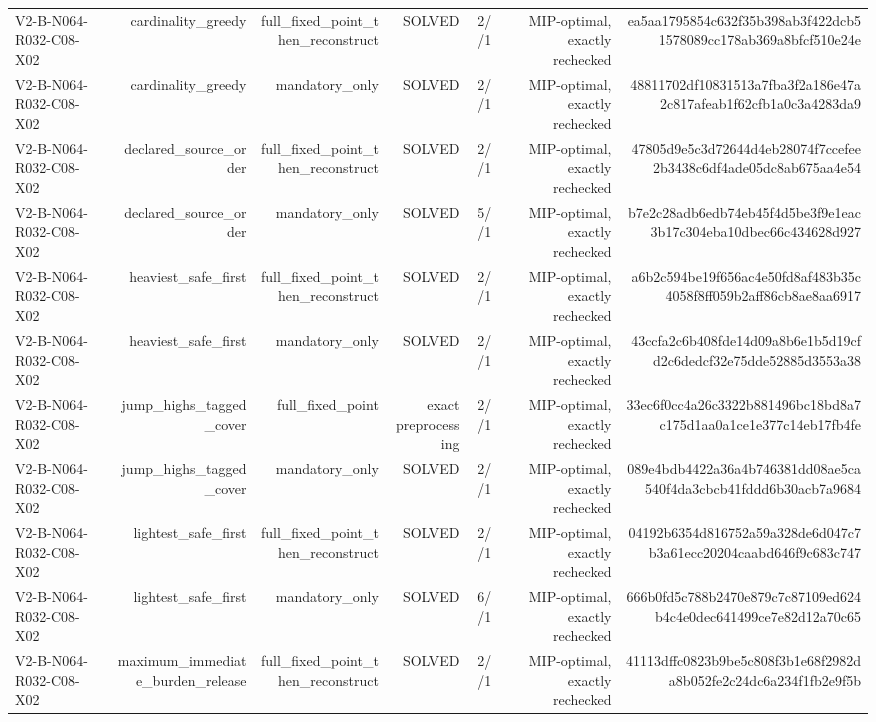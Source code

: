 {\begin{longtable}{lrrrrrr}
V2-B-N064-R032-C08-X02 & cardinality\_greedy & full\_fixed\_point\_then\_reconstruct & SOLVED & 2//1 & MIP-optimal, exactly rechecked & ea5aa1795854c632f35b398ab3f422dcb51578089cc178ab369a8bfcf510e24e \\
V2-B-N064-R032-C08-X02 & cardinality\_greedy & mandatory\_only & SOLVED & 2//1 & MIP-optimal, exactly rechecked & 48811702df10831513a7fba3f2a186e47a2c817afeab1f62cfb1a0c3a4283da9 \\
V2-B-N064-R032-C08-X02 & declared\_source\_order & full\_fixed\_point\_then\_reconstruct & SOLVED & 2//1 & MIP-optimal, exactly rechecked & 47805d9e5c3d72644d4eb28074f7ccefee2b3438c6df4ade05dc8ab675aa4e54 \\
V2-B-N064-R032-C08-X02 & declared\_source\_order & mandatory\_only & SOLVED & 5//1 & MIP-optimal, exactly rechecked & b7e2c28adb6edb74eb45f4d5be3f9e1eac3b17c304eba10dbec66c434628d927 \\
V2-B-N064-R032-C08-X02 & heaviest\_safe\_first & full\_fixed\_point\_then\_reconstruct & SOLVED & 2//1 & MIP-optimal, exactly rechecked & a6b2c594be19f656ac4e50fd8af483b35c4058f8ff059b2aff86cb8ae8aa6917 \\
V2-B-N064-R032-C08-X02 & heaviest\_safe\_first & mandatory\_only & SOLVED & 2//1 & MIP-optimal, exactly rechecked & 43ccfa2c6b408fde14d09a8b6e1b5d19cfd2c6dedcf32e75dde52885d3553a38 \\
V2-B-N064-R032-C08-X02 & jump\_highs\_tagged\_cover & full\_fixed\_point & exact preprocessing & 2//1 & MIP-optimal, exactly rechecked & 33ec6f0cc4a26c3322b881496bc18bd8a7c175d1aa0a1ce1e377c14eb17fb4fe \\
V2-B-N064-R032-C08-X02 & jump\_highs\_tagged\_cover & mandatory\_only & SOLVED & 2//1 & MIP-optimal, exactly rechecked & 089e4bdb4422a36a4b746381dd08ae5ca540f4da3cbcb41fddd6b30acb7a9684 \\
V2-B-N064-R032-C08-X02 & lightest\_safe\_first & full\_fixed\_point\_then\_reconstruct & SOLVED & 2//1 & MIP-optimal, exactly rechecked & 04192b6354d816752a59a328de6d047c7b3a61ecc20204caabd646f9c683c747 \\
V2-B-N064-R032-C08-X02 & lightest\_safe\_first & mandatory\_only & SOLVED & 6//1 & MIP-optimal, exactly rechecked & 666b0fd5c788b2470e879c7c87109ed624b4c4e0dec641499ce7e82d12a70c65 \\
V2-B-N064-R032-C08-X02 & maximum\_immediate\_burden\_release & full\_fixed\_point\_then\_reconstruct & SOLVED & 2//1 & MIP-optimal, exactly rechecked & 41113dffc0823b9be5c808f3b1e68f2982da8b052fe2c24dc6a234f1fb2e9f5b \\

\end{longtable}}
